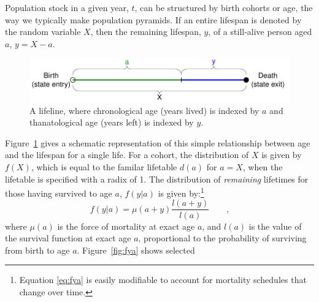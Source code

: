 \documentclass{article}
\newcommand{\tc}{\quad\quad\text{,}}
\begin{document}

Population stock in a
 given year, $t$, can be structured by birth cohorts or age, the way we typically make 
 population pyramids. If an entire lifespan is denoted by the random variable
 $X$, then the remaining lifespan, $y$, of a still-alive person aged $a$, $y = X - a$.
\begin{figure}[h]
\centering
	\caption{A lifeline, where chronological age (years lived) is indexed by $a$
	and thanatological age (years left) is indexed by $y$.}
	\label{fig:line}
	\includegraphics[scale=.8]{Figures/LifeLine.pdf}	
\end{figure}
Figure~\ref{fig:line} gives a schematic representation of this simple
relationship between age and the lifespan for a single life.
For a cohort, the distribution of $X$ is given by $f(X)$, which is equal to the familar lifetable
$d(a)$ for $a = X$, when the lifetable is specified with a radix of 1. The
distribution of \textit{remaining} lifetimes for those having survived to age $a$, $f(y|a)$ is
given by:\footnote{Equation \eqref{eq:fya} is easily modifiable to account for
mortality schedules that change over time.}
\begin{equation}
\label{eq:fya}
f(y|a) = \mu(a+y) \frac{l(a+y)}{l(a)} \tc
\end{equation}
where $\mu(a)$ is the force of mortality at exact age $a$, and $l(a)$ is
the value of the survival function at exact age $a$, proportional to the
probability of surviving from birth to age $a$. Figure~\ref{fig:fya} shows selected
\end{document}
